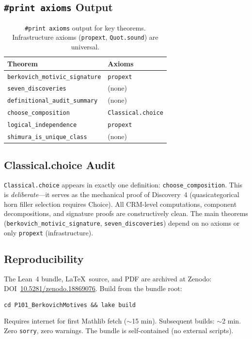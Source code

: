 \documentclass[11pt,a4paper]{article}
\theoremstyle{plain}
\theoremstyle{definition}
\begin{document}
\subsection{\texttt{\#print axioms} Output}

\begin{table}[ht]
\centering
\begin{tabular}{@{}ll@{}}
\toprule
\textbf{Theorem} & \textbf{Axioms} \\
\midrule
\texttt{berkovich\_motivic\_signature} & \texttt{propext} \\
\texttt{seven\_discoveries} & (none) \\
\texttt{definitional\_audit\_summary} & (none) \\
\texttt{choose\_composition} & \texttt{Classical.choice} \\
\texttt{logical\_independence} & \texttt{propext} \\
\texttt{shimura\_is\_unique\_class} & (none) \\
\bottomrule
\end{tabular}
\caption{\texttt{\#print axioms} output for key theorems. Infrastructure axioms (\texttt{propext}, \texttt{Quot.sound}) are universal.}
\label{tab:print-axioms}
\end{table}

\subsection{Classical.choice Audit}

\texttt{Classical.choice} appears in exactly one definition: \texttt{choose\_composition}. This is \emph{deliberate}---it serves as the mechanical proof of Discovery~4 (quasicategorical horn filler selection requires Choice). All CRM-level computations, component decompositions, and signature proofs are constructively clean. The main theorems (\texttt{berkovich\_motivic\_signature}, \texttt{seven\_discoveries}) depend on no axioms or only \texttt{propext} (infrastructure).

\subsection{Reproducibility}

The Lean~4 bundle, \LaTeX\ source, and PDF are archived at Zenodo: DOI~\href{https://doi.org/10.5281/zenodo.18869076}{10.5281/zenodo.18869076}. Build from the bundle root:
\begin{lstlisting}
cd P101_BerkovichMotives && lake build
\end{lstlisting}
Requires internet for first Mathlib fetch ($\sim$15 min). Subsequent builds: $\sim$2 min. Zero \texttt{sorry}, zero warnings. The bundle is self-contained (no external scripts).
\end{document}
